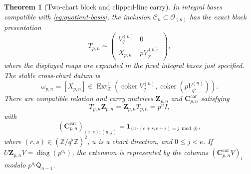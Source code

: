 \documentclass[12pt,a4paper]{article}
\newtheorem{theorem}{Theorem}[section]
\theoremstyle{definition}
\newcommand{\Z}{\mathbb Z}
\newcommand{\OO}{\mathcal O}
\newcommand{\QQ}{\mathsf Q}
\newcommand{\coker}{\operatorname{coker}}
\begin{document}
\begin{theorem}[Two-chart block and clipped-line carry]
\label{thm:two-chart-block}
In integral bases compatible with \eqref{eq:quotient-basis}, the inclusion
$\mathcal C_n\subset\OO_{(n)}$ has the exact block presentation
\begin{equation}\label{eq:two-chart}
 T_{p,n}\sim
 \begin{pmatrix}
 V_q^{(n)}&0\\
 X_{p,n}&pV_{q^\flat}^{(n)}
 \end{pmatrix},
\end{equation}
where the displayed maps are expanded in the fixed integral bases just
specified.  The stable cross-chart datum is
\[
 \omega_{p,n}=[X_{p,n}]\in
 \operatorname{Ext}^1_{\Z}(\coker V_q^{(n)},
                            \coker(pV_{q^\flat}^{(n)})).
\]
There are compatible relation and carry matrices $\mathbf Z_{p,n}$ and
$\mathbf C^{\mathrm{car}}_{p,n}$ satisfying
\begin{equation}\label{eq:TZ}
 T_{p,n}\mathbf Z_{p,n}=\mathbf Z_{p,n}T_{p,n}=p^nI,
\end{equation}
with
\begin{equation}\label{eq:clipped-carry}
 (\mathbf C^{\mathrm{car}}_{p,n})_{(r,s);(u,j)}=
 \mathbf1_{\{u\cdot(e+r,e+s)=j\bmod q\}},
\end{equation}
where $(r,s)\in(\Z/q^\flat\Z)^2$, $u$ is a chart direction, and
$0\leq j<e$.  If
$U\mathbf Z_{p,n}V=\operatorname{diag}(p^{a_i})$, the extension is
represented by the columns $(\mathbf C^{\mathrm{car}}_{p,n}V)_i$ modulo
$p^{a_i}\QQ_{n-1}$.
\end{theorem}
\end{document}
